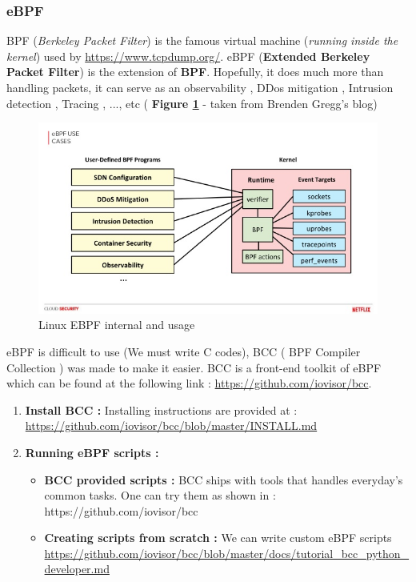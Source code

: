 \subsubsection{eBPF}
BPF (\textit{Berkeley Packet Filter}) is the famous virtual machine (\textit{running inside the kernel}) used by {\color{blue}\url{https://www.tcpdump.org/}}.
eBPF (\textbf{Extended Berkeley Packet Filter}) is the extension of \textbf{BPF}. Hopefully, it does much more than handling packets, it can serve as an observability , DDos mitigation , Intrusion detection , Tracing , ..., etc ( \textbf{Figure \ref{Linux EBPF internal and usage}} - taken from Brenden Gregg's blog)
					\begin{figure}[H]
						\centering
        				\includegraphics[scale=0.4]{img/solution/security-monitoring-with-ebpf-11-638.jpg}
        				\caption{Linux EBPF internal and usage}
        				\label{Linux EBPF internal and usage}
    				\end{figure}	

eBPF is difficult to use (We must write C codes), BCC ( BPF Compiler Collection ) was made to make it easier.
BCC is a front-end toolkit of eBPF which can be found at the following link : {\color{blue}\url{https://github.com/iovisor/bcc}}.


\begin{enumerate}
	\item \textbf{Install BCC : } Installing instructions are provided at : {\color{blue}\url{https://github.com/iovisor/bcc/blob/master/INSTALL.md}}
	
	\item \textbf{Running eBPF scripts : } 
		\begin{itemize}
			\item \textbf{BCC provided scripts : } BCC ships with tools that handles everyday's common tasks. One can try them as shown in : {\color{blue}https://github.com/iovisor/bcc}
			
			\item \textbf{Creating scripts from scratch : } We can write custom eBPF scripts {\color{blue}\url{https://github.com/iovisor/bcc/blob/master/docs/tutorial_bcc_python_developer.md}}
						
			
		\end{itemize}			
\end{enumerate}

